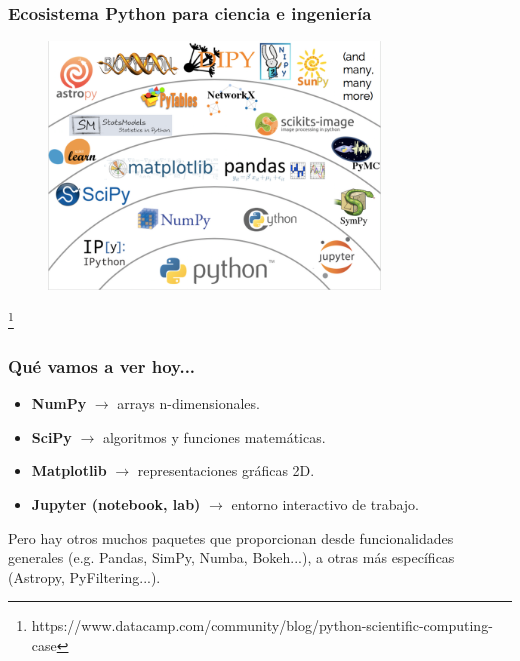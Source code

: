 \documentclass[18pt]{beamer}
\newcommand\blfootnote[1]{%
  \begingroup
  \renewcommand\thefootnote{}\footnote{#1}%
  \addtocounter{footnote}{-1}%
  \endgroup
}
\begin{document}
\begin{frame}

	\frametitle{Ecosistema Python para ciencia e ingeniería}
	
	\begin{figure}
		\includegraphics[width=8.8cm]{images/python_ecosystem.png}
	\end{figure}
	
	\blfootnote{\scriptsize https://www.datacamp.com/community/blog/python-scientific-computing-case}
	
\end{frame}


\begin{frame}

	\frametitle{Qué vamos a ver hoy...}
	
	\begin{itemize}
		\setlength\itemsep{0.7em}
		\item \textbf{NumPy} $\rightarrow$ arrays n-dimensionales.
		\item \textbf{SciPy} $\rightarrow$ algoritmos y funciones 
		 matemáticas.
		\item \textbf{Matplotlib} $\rightarrow$ representaciones 
		 gráficas 2D.
		\item \textbf{Jupyter (notebook, lab)} $\rightarrow$ entorno 
  		 interactivo de trabajo.
	\end{itemize}
                   
    \vspace{0.2cm}
                   
	Pero hay otros muchos paquetes que proporcionan desde funcionalidades
	generales (e.g. Pandas, SimPy, Numba, Bokeh...), a otras más
	específicas (Astropy, PyFiltering...).

\end{frame}
\end{document}
